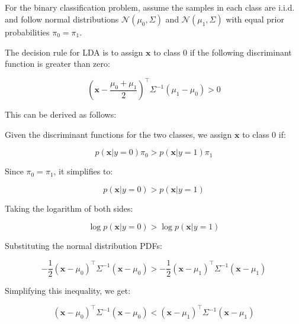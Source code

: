 \documentclass[oneside,solution]{seu-ml-assign}
\begin{document}
\subsection{}
For the binary classification problem, assume the samples in each class are i.i.d. and follow normal distributions \(\mathcal{N}(\mu_0, \Sigma)\) and \(\mathcal{N}(\mu_1, \Sigma)\) with equal prior probabilities \(\pi_0 = \pi_1\).

The decision rule for LDA is to assign \(\mathbf{x}\) to class 0 if the following discriminant function is greater than zero:

\begin{equation}
  (\mathbf{x} - \frac{\mu_0 + \mu_1}{2})^\top \Sigma^{-1} (\mu_1 - \mu_0) > 0
\end{equation}

This can be derived as follows:

Given the discriminant functions for the two classes, we assign \(\mathbf{x}\) to class 0 if:

\begin{equation}
  p(\mathbf{x} | y = 0) \pi_0 > p(\mathbf{x} | y = 1) \pi_1
\end{equation}

Since \(\pi_0 = \pi_1\), it simplifies to:

\begin{equation}
  p(\mathbf{x} | y = 0) > p(\mathbf{x} | y = 1)
\end{equation}

Taking the logarithm of both sides:

\begin{equation}
  \log p(\mathbf{x} | y = 0) > \log p(\mathbf{x} | y = 1)
\end{equation}

Substituting the normal distribution PDFs:

\begin{equation}
  -\frac{1}{2} (\mathbf{x} - \mu_0)^\top \Sigma^{-1} (\mathbf{x} - \mu_0) > -\frac{1}{2} (\mathbf{x} - \mu_1)^\top \Sigma^{-1} (\mathbf{x} - \mu_1)
\end{equation}

Simplifying this inequality, we get:

\begin{equation}
  (\mathbf{x} - \mu_0)^\top \Sigma^{-1} (\mathbf{x} - \mu_0) < (\mathbf{x} - \mu_1)^\top \Sigma^{-1} (\mathbf{x} - \mu_1)
\end{equation}
\end{document}

